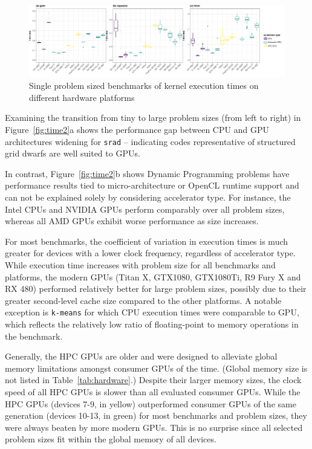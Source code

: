 \documentclass[../document.tex]{subfiles}
\begin{document}
\begin{figure}
    \centering
    \includegraphics[width=\textwidth,keepaspectratio]{figures/new-time-results/generate_main_2x3_bandwplot}
    \caption{Single problem sized benchmarks of kernel execution times on different hardware platforms}
    \label{fig:time3}
\end{figure}


Examining the transition from tiny to large problem sizes (from left to right) in Figure~\ref{fig:time2}a shows the performance gap between CPU and GPU architectures widening for {\tt srad} -- indicating codes representative of structured grid dwarfs are well suited to GPUs.

In contrast, Figure~\ref{fig:time2}b shows Dynamic Programming problems have performance results tied to micro-architecture or OpenCL runtime support and can not be explained solely by considering accelerator type.
For instance, the Intel CPUs and NVIDIA GPUs perform comparably over all problem sizes, whereas all AMD GPUs exhibit worse performance as size increases.

For most benchmarks, the coefficient of variation in execution times is much greater for devices with a lower clock frequency, regardless of accelerator type.
While execution time increases with problem size for all benchmarks and platforms, the modern GPUs (Titan X, GTX1080, GTX1080Ti, R9 Fury X and RX 480) performed relatively better for large problem sizes, possibly due to their greater second-level cache size compared to the other platforms.
A notable exception is {\tt k-means} for which CPU execution times were comparable to GPU, which reflects the relatively low ratio of floating-point to memory operations in the benchmark.

Generally, the HPC GPUs are older and were designed to alleviate global memory limitations amongst consumer GPUs of the time.
(Global memory size is not listed in Table~\ref{tab:hardware}.)
Despite their larger memory sizes, the clock speed of all HPC GPUs is slower than all evaluated consumer GPUs.
While the HPC GPUs (devices 7-9, in yellow) outperformed consumer GPUs of the same generation (devices 10-13, in green) for most benchmarks and problem sizes, they were always beaten by more modern GPUs.
This is no surprise since all selected problem sizes fit within the global memory of all devices.
\end{document}
